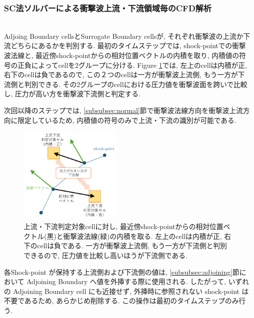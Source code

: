 \documentclass[a4j]{jarticle}
\begin{document}

\subsubsection{SC法ソルバーによる衝撃波上流・下流領域毎のCFD解析} \label{subsubsec:sc}
\mbox{}\\[-1.0ex]

Adjoing Boundary cellsとSurrogate Boundary cellsが, それぞれ衝撃波の上流か下流どちらにあるかを判別する.
最初のタイムステップでは, shock-pointでの衝撃波法線と, 最近傍shock-pointからの相対位置ベクトルの内積を取り, 内積値の符号の正負によってcellを2グループに分ける.
Figure \ref{fig:updownjudge}では, 左上のcellは内積が正, 右下のcellは負であるので, この２つのcellは一方が衝撃波上流側, もう一方が下流側と判別できる.
その2グループのcellにおける圧力値を衝撃波面を跨いで比較し, 圧力が高い方を衝撃波下流側と判定する.

次回以降のステップでは, \ref{subsubsec:normal}節で衝撃波法線方向を衝撃波上流方向に限定しているため, 
内積値の符号のみで上流・下流の識別が可能である.

\begin{figure}[h]
    \begin{center}
        \includegraphics[width=0.45\textwidth]{updownjudge.pdf}
    \end{center}
    \caption{上流・下流判定対象cellに対し, 最近傍shock-pointからの相対位置ベクトル(黒)と衝撃波法線(緑)の内積を取る.
    左上のcellは内積が正, 右下のcellは負である.  一方が衝撃波上流側, もう一方が下流側と判別できるので, 圧力値を比較し高いほうが下流側である.}
    \label{fig:updownjudge}
\end{figure}

各Shock-point が保持する上流側および下流側の値は, \ref{subsubsec:adjoining}節において Adjoining Boundary へ値を外挿する際に使用される.
したがって, いずれの Adjoining Boundary cell にも近接せず, 外挿時に参照されない shock-point は不要であるため, あらかじめ削除する.
この操作は最初のタイムステップのみ行う.
\end{document}
